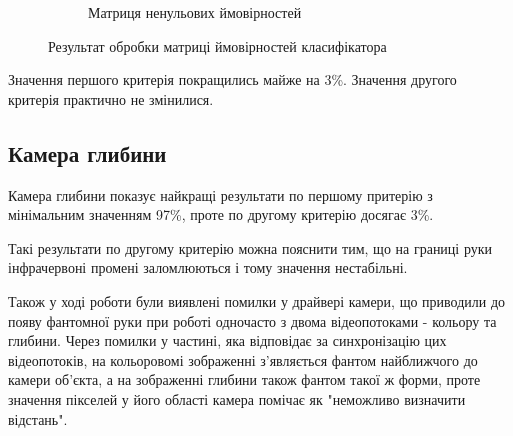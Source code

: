 \begin{figure}[H]
\begin{subfigure}[b]{0.45\textwidth}
		\caption{Матриця ненульових ймовірностей}
		\label{fig:b_end_gen}
	\end{subfigure}
	\caption{Результат обробки матриці ймовірностей класифікатора}
	\label{fig:bayesian_representation_end}
\end{figure}

Значення першого критерія покращились майже на 3\%. Значення другого критерія практично не змінилися.

\subsection{Камера глибини}

Камера глибини показує найкращі результати по першому притерію з мінімальним значенням 97\%, проте по другому критерію досягає 3\%.

Такі результати по другому критерію можна пояснити тим, що на границі руки інфрачервоні промені заломлюються і тому значення нестабільні.

Також у ході роботи були виявлені помилки у драйвері камери, що приводили до появу фантомної руки при роботі одночасто з двома відеопотоками - кольору та глибини. Через помилки у частині, яка відповідає за синхронізацію цих відеопотоків, на кольоровомі зображенні з'являється фантом найближчого до камери об'єкта, а на зображенні глибини також фантом такої ж форми, проте значення пікселей у його області камера помічає як "неможливо визначити відстань".

